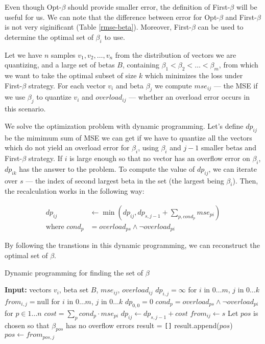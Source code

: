 Even though Opt-$\beta$ should provide smaller error, the definition of First-$\beta$ will be useful for us. We can note that the difference between error for Opt-$\beta$ and First-$\beta$ is not very siginificant (Table \ref{rmse-beta}). Moreover, First-$\beta$ can be used to determine the optimal set of $\beta_i$ to use.

Let we have $n$ samples $v_1, v_2, \ldots, v_n$ from the distribution of vectors we are quantizing, and a large set of betas $B$, containing $\beta_1 < \beta_2 < \ldots < \beta_m$, from which we want to take the optimal subset of size $k$ which minimizes the loss under First-$\beta$ strategy. For each vector $v_i$ and beta $\beta_j$ we compute $mse_{ij}$ --- the MSE if we use $\beta_j$ to quantize $v_i$ and $overload_{ij}$ --- whether an overload error occurs in this scenario.

We solve the optimization problem with dynamic programming. Let's define $dp_{ij}$ be the mimimum sum of MSE we can get if we have to quantize all the vectors which do not yield an overload error for $\beta_i$, using $\beta_i$ and $j - 1$ smaller betas and First-$\beta$ strategy. If $i$ is large enough so that no vector has an overflow error on $\beta_i$, $dp_{ik}$ has the answer to the problem. To compute the value of $dp_{ij}$, we can iterate over $s$ --- the index of second largest beta in the set (the largest being $\beta_i$). Then, the recalculation works in the following way:

\begin{align*}
    dp_{ij} &\leftarrow \min\left(dp_{ij}, dp_{s, j-1} + \sum_{p, cond_p} mse_{pi} \right) \\
    \text{where } cond_p &= overload_{ps} \wedge \neg overload_{pi}
\end{align*}

By following the transtions in this dynamic programming, we can reconstruct the optimal set of $\beta$.

\begin{algorithm}[h]
\caption{Dynamic programming for finding the set of $\beta$}
\label{alg:DP}
\begin{algorithmic}[1]

\State \textbf{Input:} vectors $v_i$, beta set $B$, $mse_{ij}$, $overload_{ij}$
\State $dp_{i, j} = \infty$ for $i$ in $0\ldots m$, $j$ in $0\ldots k$
\State $from_{i, j} = \text{null}$ for $i$ in $0\ldots m$, $j$ in $0\ldots k$
\State $dp_{0, 0} = 0$
            \State $cond_p = overload_{ps} \wedge \neg overload_{pi}$ for $p \in 1\ldots n$
            \State $cost = \sum_p cond_p \cdot mse_{pi}$
                \State $dp_{ij} \leftarrow dp_{s, j-1} + cost$
                \State $from_{ij} \leftarrow s$
            \EndIf
        \EndFor
    \EndFor
\EndFor
\State Let $pos$ is chosen so that $\beta_{pos}$ has no overflow errors
\State result = \verb|[]|
\State result.append($pos$)
\State $pos \leftarrow from_{pos, j}$
\EndFor

\end{algorithmic}
\end{algorithm}


